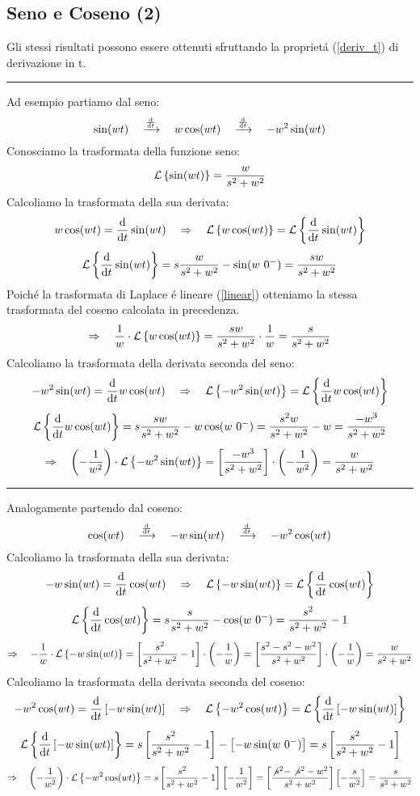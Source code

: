 \documentclass[../main.tex]{subfiles}
\begin{document}
	\subsection{Seno e Coseno (2)}
	Gli stessi risultati possono essere ottenuti sfruttando la propriet\'{a} (\ref{deriv_t}) di derivazione in t.\\
	\rule{\linewidth}{0.4pt}
	Ad esempio partiamo dal seno:
	$$ \sin(wt) \quad \xrightarrow{\frac{\mathrm{d} }{\mathrm{d} t}} \quad w \cos(wt) \quad \xrightarrow{\frac{\mathrm{d} }{\mathrm{d} t}} \quad -w^2 \sin(wt) $$
	Conosciamo la trasformata della funzione seno:
	$$ \mathcal{L} \left\lbrace \sin(wt) \right\rbrace = \frac{w}{s^2+w^2} $$
	Calcoliamo la trasformata della sua derivata:
	$$ w \cos(wt) = \frac{\mathrm{d} }{\mathrm{d} t} \sin(wt) \quad\Rightarrow\quad \mathcal{L} \left\lbrace w \cos(wt) \right\rbrace = \mathcal{L} \left\lbrace \frac{\mathrm{d} }{\mathrm{d} t} \sin(wt) \right\rbrace $$
	$$ \mathcal{L} \left\lbrace \frac{\mathrm{d} }{\mathrm{d} t} \sin(wt) \right\rbrace = s \frac{w}{s^2+w^2} - \sin(w\ 0^-) = \frac{sw}{s^2+w^2} $$
	Poich\'{e} la trasformata di Laplace \'{e} lineare (\ref{linear}) otteniamo la stessa trasformata del coseno calcolata in precedenza.
	$$ \Rightarrow \quad \frac{1}{w} \cdot \mathcal{L} \left\lbrace w\cos(wt) \right\rbrace = \frac{sw}{s^2+w^2} \cdot \frac{1}{w} = \frac{s}{s^2+w^2} $$
	Calcoliamo la trasformata della derivata seconda del seno:
	$$ -w^2 \sin(wt) = \frac{\mathrm{d} }{\mathrm{d} t} w\cos(wt) \quad\Rightarrow\quad \mathcal{L} \left\lbrace -w^2 \sin(wt) \right\rbrace = \mathcal{L} \left\lbrace \frac{\mathrm{d} }{\mathrm{d} t} w\cos(wt) \right\rbrace $$
	$$ \mathcal{L} \left\lbrace \frac{\mathrm{d} }{\mathrm{d} t} w\cos(wt) \right\rbrace = s \frac{sw}{s^2+w^2} - w\cos(w\ 0^-) = \frac{s^2w}{s^2+w^2} - w = \frac{-w^3}{s^2+w^2}$$
	$$ \Rightarrow \quad \left( - \frac{1}{w^2} \right) \cdot \mathcal{L} \left\lbrace -w^2 \sin(wt) \right\rbrace = \left[ \frac{-w^3}{s^2+w^2} \right] \cdot \left( - \frac{1}{w^2} \right) = \frac{w}{s^2+w^2} $$
	\rule{\linewidth}{0.4pt}
	Analogamente partendo dal coseno:
	$$ \cos(wt) \quad \xrightarrow{\frac{\mathrm{d} }{\mathrm{d} t}} \quad -w\sin(wt) \quad \xrightarrow{\frac{\mathrm{d} }{\mathrm{d} t}} \quad -w^2\cos(wt) $$	
	Calcoliamo la trasformata della sua derivata:
	$$ -w\sin(wt) = \frac{\mathrm{d} }{\mathrm{d} t} \cos(wt) \quad\Rightarrow\quad \mathcal{L} \left\lbrace -w\sin(wt) \right\rbrace = \mathcal{L} \left\lbrace \frac{\mathrm{d} }{\mathrm{d} t} \cos(wt) \right\rbrace $$
	$$ \mathcal{L} \left\lbrace \frac{\mathrm{d} }{\mathrm{d} t} \cos(wt) \right\rbrace = s \frac{s}{s^2+w^2} - \cos(w\ 0^-) = \frac{s^2}{s^2+w^2} - 1 $$
	$$ \Rightarrow \quad -\frac{1}{w} \cdot \mathcal{L} \left\lbrace -w\sin(wt) \right\rbrace = \left[ \frac{s^2}{s^2+w^2} - 1 \right] \cdot \left( -\frac{1}{w}\right) = \left[ \frac{s^2-s^2-w^2}{s^2+w^2} \right] \cdot \left( -\frac{1}{w}\right) = \frac{w}{s^2+w^2} $$
	Calcoliamo la trasformata della derivata seconda del coseno:
	$$ -w^2 \cos(wt) = \frac{\mathrm{d} }{\mathrm{d} t} \left[ -w\sin(wt) \right] \quad\Rightarrow\quad \mathcal{L} \left\lbrace -w^2 \cos(wt) \right\rbrace = \mathcal{L} \left\lbrace \frac{\mathrm{d} }{\mathrm{d} t} \left[ -w\sin(wt) \right] \right\rbrace $$
	$$ \mathcal{L} \left\lbrace \frac{\mathrm{d} }{\mathrm{d} t} \left[ -w\sin(wt) \right] \right\rbrace = s \left[ \frac{s^2}{s^2+w^2} - 1 \right] - \left[ -w\sin(w\ 0^-) \right] = s \left[ \frac{s^2}{s^2+w^2} - 1 \right] $$
	$$ \Rightarrow \quad \left( - \frac{1}{w^2} \right) \cdot \mathcal{L} \left\lbrace -w^2 \cos(wt) \right\rbrace = s \left[ \frac{s^2}{s^2+w^2} - 1 \right] \left[ - \frac{1}{w^2} \right] = \left[ \frac{\not{s^2}-\not{s^2}-w^2}{s^2+w^2} \right] \left[ -\frac{s}{w^2} \right] = \frac{s}{s^2+w^2} $$
\end{document}
